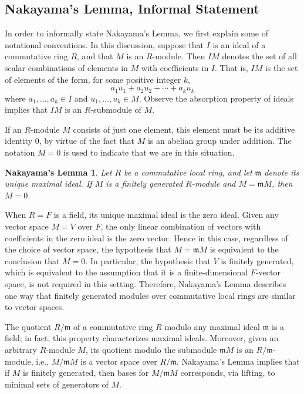 \documentclass[referee,sn-mathphys]{sn-jnl}
\newtheorem*{nak*}{Nakayama's Lemma}
\theoremstyle{definition}
\theoremstyle{remark}
\numberwithin{equation}{section}
\numberwithin{figure}{subsection}
\begin{document}
\subsection{Nakayama's Lemma, Informal Statement}

In order to informally state Nakayama's Lemma, we first explain some of notational 
conventions.  In this discussion, suppose that  $I$ is an ideal of a commutative ring $R$, 
and that $M$ is an $R$-module. Then $IM$ denotes the set of all scalar combinations of 
elements in $M$ with coefficients in $I$.  That is, $IM$ is the set of  elements of the form, 
for some positive integer $k$,
 \[a_1 u_1 + a_2 u_2 + \cdots + a_k u_k\] 
where $a_1, \ldots, a_k \in I$ and
$u_1, \ldots, u_k \in M$. Observe the absorption property of ideals implies that 
$I M$ is an $R$-submodule of $M$. 

If an $R$-module $M$ consists of just one element, this element must be its
additive identity $0$, by virtue of the fact that $M$ is an abelian group under addition. 
The notation $M=0$ is used to indicate that we are in this situation. 

\begin{nak*}
Let $R$ be a commutative local ring, and let $\mathfrak{m}$ denote its unique
maximal ideal. If $M$ is a finitely generated $R$-module and
$M = \mathfrak{m} M$, then $M = 0$. 
\end{nak*}

When $R=F$ is a field, its unique maximal ideal is the zero ideal.  
Given any vector space $M=V$ over $F$, the only linear combination of vectors with
coefficients in the zero ideal is the zero vector. Hence in this case, regardless of the choice of 
vector space, the hypothesis that  $M = \mathfrak{m} M$ is equivalent to the conclusion that
$M=0$. 
In particular, the hypothesis that $V$ is finitely generated, which is equivalent to the
assumption that it is a finite-dimensional $F$-vector space, is not required in this setting. 
Therefore, Nakayama's Lemma describes one way that finitely generated modules
over commutative local rings are similar to vector spaces. 

The quotient $R/\mathfrak{m}$ of a commutative ring $R$ modulo any maximal ideal 
$\mathfrak{m}$ is a field; in fact, this property characterizes maximal ideals. 
Moreover, given an arbitrary $R$-module $M$, its quotient modulo the
submodule $\mathfrak{m}M$ is an $R/\mathfrak{m}$-module, i.e.,
$M/\mathfrak{m}M$ is a vector space over $R/\mathfrak{m}$. Nakayama's Lemma
implies that if $M$ is finitely generated, then bases for $M/\mathfrak{m}M$
corresponds, via lifting, to minimal sets of generators of $M$. 
\end{document}
